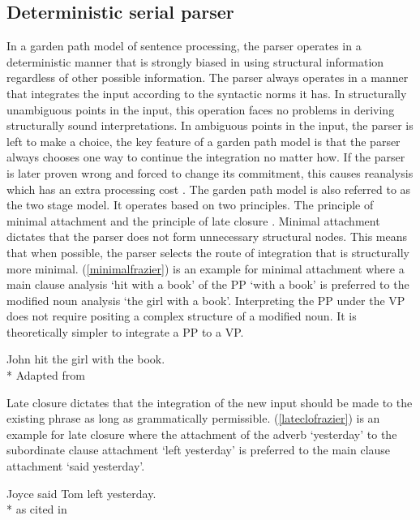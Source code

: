 \subsection{Deterministic serial parser}

In a garden path model of sentence processing, the parser operates in a deterministic manner that is strongly biased in using structural information regardless of other possible information. The parser always operates in a manner that integrates the input according to the syntactic norms it has. In structurally unambiguous points in the input, this operation faces no problems in deriving structurally sound interpretations. In ambiguous points in the input, the parser is left to make a choice, the key feature of a garden path model is that the parser always chooses one way to continue the integration no matter how. If the parser is later proven wrong and forced to change its commitment, this causes reanalysis which has an extra processing cost \citep{frazier1978sausage}. The garden path model is also referred to as the two stage model. It operates based on two principles. The principle of minimal attachment and the principle of late closure \citep{frazier1987sentence}. Minimal attachment dictates that the parser does not form unnecessary structural nodes. This means that when possible, the parser selects the route of integration that is structurally more minimal. (\ref{minimalfrazier}) is an example for minimal attachment where a main clause analysis `hit with a book' of the PP `with a book' is preferred to the modified noun analysis `the girl with a book'. Interpreting the PP under the VP does not require positing a complex structure of a modified noun. It is theoretically simpler to integrate a PP to a VP.

\begin{exe}
\ex \label{minimalfrazier}
John hit the girl with the book. \\*
\hfill Adapted from \citet{frazier1987sentence}
\end{exe}


Late closure dictates that the integration of the new input should be made to the existing phrase as long as grammatically permissible. (\ref{lateclofrazier}) is an example for late closure where the attachment of the adverb `yesterday' to the subordinate clause attachment `left yesterday' is preferred to the main clause attachment `said yesterday'. 

\begin{exe}
\ex \label{lateclofrazier}
Joyce said Tom left yesterday. \\*
\hfill as cited in \citet{frazier1987sentence}
\end{exe}

